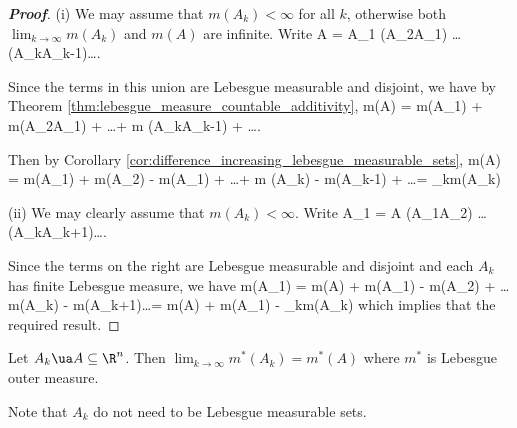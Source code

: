 \begin{proof}[\bf Proof]
\ben
\item [(i)] We may assume that $m(A_k) < \infty$ for all $k$, otherwise both $\lim_{k\to \infty} m(A_k)$ and $m(A)$ are infinite. Write
\be
A = A_1 \cup (A_2\bs A_1) \cup \dots \cup (A_k\bs A_{k-1})\cup \dots.
\ee

Since the terms in this union are Lebesgue measurable and disjoint, we have by Theorem \ref{thm:lebesgue_measure_countable_additivity},
\be
m(A) = m(A_1) + m(A_2\bs A_1) + \dots + m (A_k\bs A_{k-1}) + \dots.
\ee

Then by Corollary \ref{cor:difference_increasing_lebesgue_measurable_sets},
\be
m(A) = m(A_1) + m(A_2) - m(A_1) + \dots + m (A_k) - m(A_{k-1}) + \dots = \lim_{k\to \infty}m(A_{k})
\ee

\item [(ii)] We may clearly assume that $m(A_k) < \infty$. Write
\be
A_1 = A \cup (A_1\bs A_2) \cup \dots \cup (A_k\bs A_{k+1})\cup \dots.
\ee

Since the terms on the right are Lebesgue measurable and disjoint and each $A_k$ has finite Lebesgue measure, we have
\be
m(A_1) =  m(A) + m(A_1) - m(A_2) + \dots  m(A_k) - m(A_{k+1})\cup \dots = m(A) + m(A_1) - \lim_{k\to \infty}m(A_{k})
\ee
which implies that the required result.
\een
\end{proof}

\begin{theorem}
Let $A_k\ua A\subseteq \R^n$. Then $\lim_{k\to \infty}m^*(A_{k}) = m^*(A)$ where $m^*$ is Lebesgue outer measure.
\end{theorem}

\begin{remark}
Note that $A_k$ do not need to be Lebesgue measurable sets.
\end{remark}

